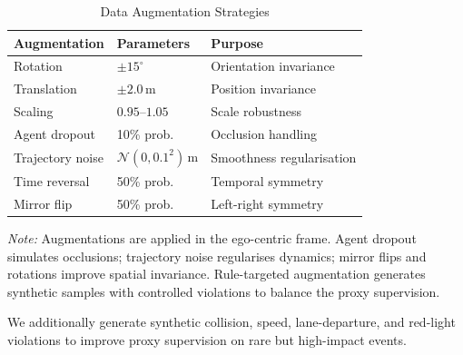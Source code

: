 \begin{table}[h]
\centering
\caption{Data Augmentation Strategies}
\label{tab:data_augmentation}
\begin{tabular}{llp{4cm}}
\toprule
\textbf{Augmentation} & \textbf{Parameters} & \textbf{Purpose} \\
\midrule
Rotation & $\pm 15^\circ$ & Orientation invariance \\
Translation & $\pm 2.0\,\mathrm{m}$ & Position invariance \\
Scaling & $0.95$--$1.05$ & Scale robustness \\
Agent dropout & 10\% prob. & Occlusion handling \\
Trajectory noise & $\mathcal{N}(0, 0.1^2)\,\mathrm{m}$ & Smoothness regularisation \\
Time reversal & 50\% prob. & Temporal symmetry \\
Mirror flip & 50\% prob. & Left-right symmetry \\
\bottomrule
\end{tabular}
\vspace{2mm}
\footnotesize
\textit{Note:} Augmentations are applied in the ego-centric frame.  Agent dropout simulates occlusions; trajectory noise regularises dynamics; mirror flips and rotations improve spatial invariance.  Rule-targeted augmentation generates synthetic samples with controlled violations to balance the proxy
supervision.
\end{table}

We additionally generate synthetic collision, speed, lane-departure, and red-light violations to improve proxy supervision on rare but high-impact events.
